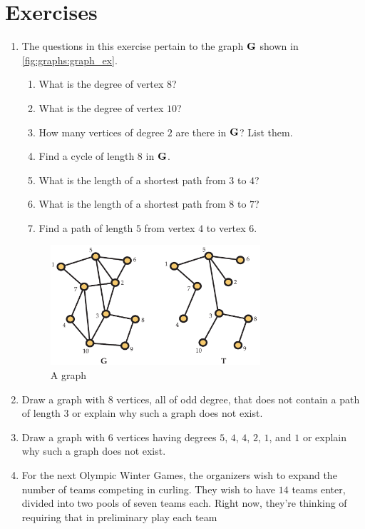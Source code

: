 \section{Exercises}\label{s:graphs:exercises}
\begin{enumerate}
\item The questions in this exercise pertain to the graph $\mathbf{G}$ shown in
  \autoref{fig:graphs:graph_ex}.
  \begin{enumerate}
  \item What is the degree of vertex $8$?
  \item What is the degree of vertex $10$?
  \item How many vertices of degree $2$ are there in $\mathbf{G}$? List
    them.
  \item Find a cycle of length $8$ in $\mathbf{G}$.
  \item What is the length of a shortest path from $3$ to $4$?
  \item What is the length of a shortest path from $8$ to $7$?
  \item Find a path of length $5$ from vertex $4$ to vertex $6$.
  \end{enumerate}
 \begin{figure}[h]
    \centering
    \includegraphics*[viewport=0 0 227 280,height=1.75in]{graphs-figs/spanning_tree}    
    \caption{A graph}
    \label{fig:graphs:graph_ex}
  \end{figure}
\item Draw a graph with $8$ vertices, all of odd degree, that does not
  contain a path of length $3$ or explain why such a graph does not
  exist.
\item Draw a graph with $6$ vertices having degrees $5$, $4$, $4$,
  $2$, $1$, and $1$ or explain why such a graph does not exist.
\item For the next Olympic Winter Games, the organizers wish to expand
  the number of teams competing in curling. They wish to have $14$
  teams enter, divided into two pools of seven teams each. Right now,
  they're thinking of requiring that in preliminary play each team

\end{enumerate}
